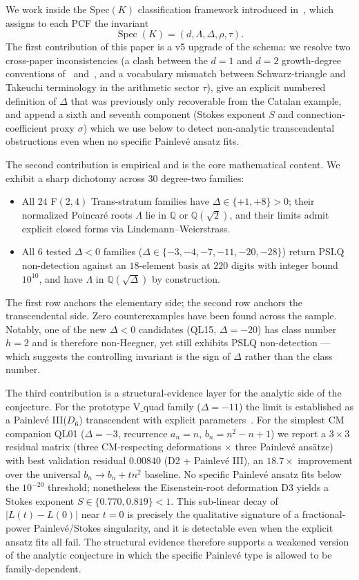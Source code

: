 \documentclass[12pt]{amsart}
\theoremstyle{definition}
\begin{document}
We work inside the Spec$(K)$ classification framework introduced
in~\cite{Papanokechi2026Spec}, which assigns to each PCF the invariant
\[
\operatorname{Spec}(K)=(d,\Lambda,\Delta,\rho,\tau).
\]
The first contribution of this paper is a v5 upgrade of the schema:
we resolve two cross-paper inconsistencies (a clash between the
$d=1$ and $d=2$ growth-degree conventions of~\cite{Papanokechi2026F24}
and~\cite{Papanokechi2026Vquad}, and a vocabulary mismatch between
Schwarz-triangle and Takeuchi terminology in the arithmetic sector
$\tau$), give an explicit numbered definition of $\Delta$ that was
previously only recoverable from the Catalan example, and append a sixth
and seventh component (Stokes exponent $S$ and connection-coefficient
proxy $\sigma$) which we use below to detect non-analytic transcendental
obstructions even when no specific Painlev\'e ansatz fits.

The second contribution is empirical and is the core mathematical content.
We exhibit a sharp dichotomy across $30$ degree-two families:
\begin{itemize}
\item All $24$ F$(2,4)$ Trans-stratum families have $\Delta\in\{+1,+8\}>0$;
their normalized Poincar\'e roots $\Lambda$ lie in $\mathbb{Q}$ or
$\mathbb{Q}(\sqrt{2})$, and their limits admit explicit closed forms via
Lindemann--Weierstrass.
\item All $6$ tested $\Delta<0$ families
($\Delta\in\{-3,-4,-7,-11,-20,-28\}$) return PSLQ non-detection against
an $18$-element basis at $220$ digits with integer bound $10^{10}$,
and have $\Lambda$ in $\mathbb{Q}(\sqrt{\Delta})$ by construction.
\end{itemize}
The first row anchors the elementary side; the second row anchors the
transcendental side. Zero counterexamples have been found across the
sample. Notably, one of the new $\Delta<0$ candidates (QL15, $\Delta=-20$)
has class number $h=2$ and is therefore non-Heegner, yet still exhibits
PSLQ non-detection --- which suggests the controlling invariant is the
sign of $\Delta$ rather than the class number.

The third contribution is a structural-evidence layer for the analytic
side of the conjecture. For the prototype V$\_$quad family ($\Delta=-11$)
the limit is established as a Painlev\'e III($D_{6}$) transcendent with
explicit parameters~\cite{Papanokechi2026Vquad}. For the simplest CM
companion QL01 ($\Delta=-3$, recurrence $a_{n}=n$, $b_{n}=n^{2}-n+1$) we
report a $3\times 3$ residual matrix (three CM-respecting deformations
$\times$ three Painlev\'e ans\"atze) with best validation residual
$0.00840$ (D2 + Painlev\'e III), an $18.7\times$ improvement over the
universal $b_{n}\to b_{n}+tn^{2}$ baseline. No specific Painlev\'e ansatz
fits below the $10^{-20}$ threshold; nonetheless the Eisenstein-root
deformation D3 yields a Stokes exponent $S\in\{0.770,0.819\}<1$.
This sub-linear decay of $|L(t)-L(0)|$ near $t=0$ is precisely the
qualitative signature of a fractional-power Painlev\'e/Stokes
singularity, and it is detectable even when the explicit ansatz fits all
fail. The structural evidence therefore supports a weakened version of
the analytic conjecture in which the specific Painlev\'e type is allowed
to be family-dependent.
\end{document}
